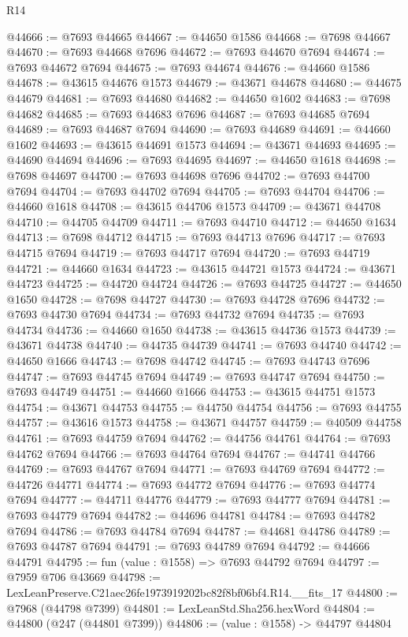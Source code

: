 \begin{lexlean}{R14}
\begin{coremodule}
@44666 := @7693 @44665
@44667 := @44650 @1586
@44668 := @7698 @44667
@44670 := @7693 @44668 @7696
@44672 := @7693 @44670 @7694
@44674 := @7693 @44672 @7694
@44675 := @7693 @44674
@44676 := @44660 @1586
@44678 := @43615 @44676 @1573
@44679 := @43671 @44678
@44680 := @44675 @44679
@44681 := @7693 @44680
@44682 := @44650 @1602
@44683 := @7698 @44682
@44685 := @7693 @44683 @7696
@44687 := @7693 @44685 @7694
@44689 := @7693 @44687 @7694
@44690 := @7693 @44689
@44691 := @44660 @1602
@44693 := @43615 @44691 @1573
@44694 := @43671 @44693
@44695 := @44690 @44694
@44696 := @7693 @44695
@44697 := @44650 @1618
@44698 := @7698 @44697
@44700 := @7693 @44698 @7696
@44702 := @7693 @44700 @7694
@44704 := @7693 @44702 @7694
@44705 := @7693 @44704
@44706 := @44660 @1618
@44708 := @43615 @44706 @1573
@44709 := @43671 @44708
@44710 := @44705 @44709
@44711 := @7693 @44710
@44712 := @44650 @1634
@44713 := @7698 @44712
@44715 := @7693 @44713 @7696
@44717 := @7693 @44715 @7694
@44719 := @7693 @44717 @7694
@44720 := @7693 @44719
@44721 := @44660 @1634
@44723 := @43615 @44721 @1573
@44724 := @43671 @44723
@44725 := @44720 @44724
@44726 := @7693 @44725
@44727 := @44650 @1650
@44728 := @7698 @44727
@44730 := @7693 @44728 @7696
@44732 := @7693 @44730 @7694
@44734 := @7693 @44732 @7694
@44735 := @7693 @44734
@44736 := @44660 @1650
@44738 := @43615 @44736 @1573
@44739 := @43671 @44738
@44740 := @44735 @44739
@44741 := @7693 @44740
@44742 := @44650 @1666
@44743 := @7698 @44742
@44745 := @7693 @44743 @7696
@44747 := @7693 @44745 @7694
@44749 := @7693 @44747 @7694
@44750 := @7693 @44749
@44751 := @44660 @1666
@44753 := @43615 @44751 @1573
@44754 := @43671 @44753
@44755 := @44750 @44754
@44756 := @7693 @44755
@44757 := @43616 @1573
@44758 := @43671 @44757
@44759 := @40509 @44758
@44761 := @7693 @44759 @7694
@44762 := @44756 @44761
@44764 := @7693 @44762 @7694
@44766 := @7693 @44764 @7694
@44767 := @44741 @44766
@44769 := @7693 @44767 @7694
@44771 := @7693 @44769 @7694
@44772 := @44726 @44771
@44774 := @7693 @44772 @7694
@44776 := @7693 @44774 @7694
@44777 := @44711 @44776
@44779 := @7693 @44777 @7694
@44781 := @7693 @44779 @7694
@44782 := @44696 @44781
@44784 := @7693 @44782 @7694
@44786 := @7693 @44784 @7694
@44787 := @44681 @44786
@44789 := @7693 @44787 @7694
@44791 := @7693 @44789 @7694
@44792 := @44666 @44791
@44795 := fun (value : @1558) => @7693 @44792 @7694
@44797 := @7959 @706 @43669
@44798 := LexLeanPreserve.C21aec26fe1973919202bc82f8bf06bf4.R14.__fits_17
@44800 := @7968 (@44798 @7399)
@44801 := LexLeanStd.Sha256.hexWord
@44804 := @44800 (@247 (@44801 @7399))
@44806 := (value : @1558) -> @44797 @44804

\end{coremodule}
\end{lexlean}

